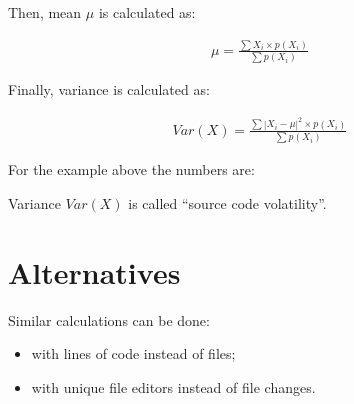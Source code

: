 \documentclass[12pt]{article}
\begin{document}
    Then, mean $\mu$ is calculated as:

    \begin{eqnarray}
    \mu = \frac{\displaystyle\sum {X_i \times p(X_i)}}{\displaystyle\sum p(X_i)}
    \end{eqnarray}

    Finally, variance is calculated as:

    \begin{eqnarray}
    Var(X) = \frac{\displaystyle\sum {|X_i - \mu|^2 \times p(X_i)}}{\displaystyle\sum p(X_i)}
    \end{eqnarray}

    For the example above the numbers are:

    \immediate{}
    

    Variance $Var(X)$ is called ``source code volatility''.

\section{Alternatives}

    Similar calculations can be done:

    \begin{itemize}
        \item with lines of code instead of files;
        \item with unique file editors instead of file changes.
    \end{itemize}
\end{document}
